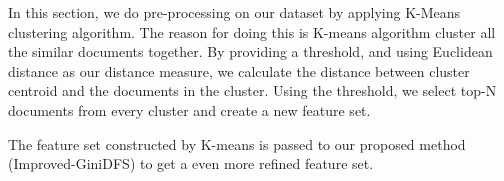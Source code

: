 \documentclass[a4paper, 14pt]{article}
\begin{document}
\begin{justify}
\begin{justify}
In this section, we do pre-processing on our dataset by applying K-Means clustering algorithm. The reason for doing this is K-means algorithm cluster all the similar documents together. By providing a threshold, and using Euclidean distance as our distance measure, we calculate the distance between cluster centroid and the documents in the cluster. Using the threshold, we select top-N documents from every cluster and create a new feature set.

\justify
The feature set constructed by K-means is passed to our proposed method (Improved-GiniDFS) to get a even more refined feature set. 


\end{justify}



\end{justify}

\clearpage
\end{document}
